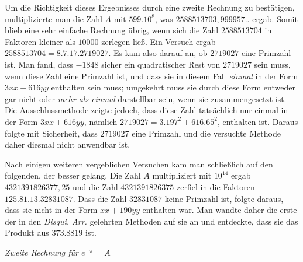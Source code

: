 Um die Richtigkeit dieses Ergebnisses durch eine zweite Rechnung
zu bestätigen, multiplizierte man die Zahl $A$ mit $599.10^8$, was
$2588513703,999957..$ ergab. Somit blieb eine sehr einfache Rechnung übrig,
wenn sich die Zahl $2588513704$ in Faktoren kleiner als $10000$ zerlegen ließ.
Ein Versuch ergab $2588513704=8.7.17.2719027$. Es kam
also darauf an, ob $2719027$ eine Primzahl ist. Man fand, dass $-1848$ sicher
ein quadratischer Rest von $2719027$ sein muss, wenn diese Zahl eine Primzahl
ist, und dass sie in diesem Fall \textit{einmal} in der Form $3xx+616yy$ enthalten
sein muss; umgekehrt muss sie durch diese Form entweder gar nicht oder
\textit{mehr als einmal} darstellbar sein, wenn sie zusammengesetzt ist.
Die Ausschlussmethode zeigte jedoch, dass diese Zahl tatsächlich nur einmal
in der Form $3xx+616yy$, nämlich $2719027=3.197^2+616.65^2$,
enthalten ist. Daraus folgte mit Sicherheit, dass $2719027$ eine Primzahl und die
versuchte Methode daher diesmal nicht anwendbar ist.

Nach einigen weiteren vergeblichen Versuchen kam man schließlich auf den
folgenden, der besser gelang. Die Zahl $A$ multipliziert mit $10^{14}$ ergab $4321391826377,25$
und die Zahl $4321391826375$ zerfiel in die Faktoren $125.81.13.32831087$. Dass
die Zahl $32831087$ keine Primzahl ist, folgte daraus, dass sie nicht in der
Form $xx+190yy$ enthalten war. Man wandte daher die erste der in den \textit{Disqui. Arr.}
gelehrten Methoden auf sie an und entdeckte, dass sie das Produkt
aus $373.8819$ ist.

\begin{center}\textit{Zweite Rechnung für $e^{-\pi}=A$}\end{center}

